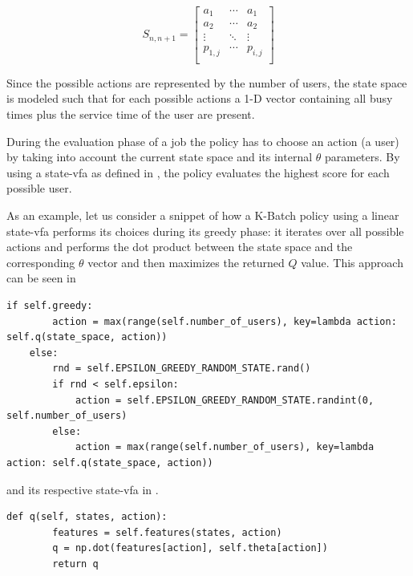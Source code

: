 \documentclass{seal_thesis}
\begin{document}
\begin{equation}
\label{eq:kbatch_sp}
	S_{n,n+1} = 
	\begin{bmatrix}
	a_1 & \cdots & a_1 \\
	a_2 & \cdots & a_2 \\
	\vdots & \ddots & \vdots \\
	p_{1,j} & \cdots & p_{i,j} \\
	\end{bmatrix}
\end{equation}

Since the possible actions are represented by the number of users, the state space is modeled such that for each possible actions a 1-D vector containing all busy times plus the service time of the user are present.

During the evaluation phase of a job the policy has to choose an action (\ie a user) by taking into account the current state space and its internal $\theta$ parameters. By using a state-\gls{vfa} as defined in , the policy evaluates the highest score for each possible user.

As an example, let us consider a snippet of how a K-Batch policy using a linear state-\gls{vfa} performs its choices during its greedy phase: it iterates over all possible actions and performs the dot product between the state space and the corresponding $\theta$ vector and then maximizes the returned $Q$ value. This approach can be seen in  

\begin{lstlisting}[caption=\gls{ep} approach,label=lst:e_greedy,style=CustomPython]
    if self.greedy:
        action = max(range(self.number_of_users), key=lambda action: self.q(state_space, action))
    else:
        rnd = self.EPSILON_GREEDY_RANDOM_STATE.rand()
        if rnd < self.epsilon:
            action = self.EPSILON_GREEDY_RANDOM_STATE.randint(0, self.number_of_users)
        else:
            action = max(range(self.number_of_users), key=lambda action: self.q(state_space, action))
\end{lstlisting}

and its respective state-\gls{vfa} in .

\begin{lstlisting}[caption=State-\gls{vfa},label=lst:value_f_approx,style=CustomPython]
    def q(self, states, action):
        features = self.features(states, action)
        q = np.dot(features[action], self.theta[action])
        return q
\end{lstlisting}
 
\end{document}
